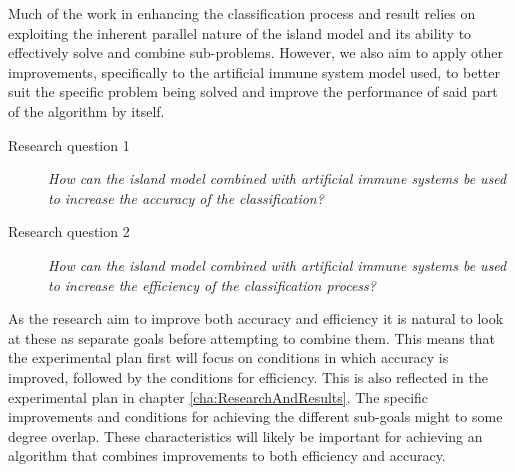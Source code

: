 Much of the work in enhancing the classification process and result relies on exploiting the inherent parallel nature of the island model and its ability to effectively solve and combine sub-problems. However, we also aim to apply other improvements, specifically to the artificial immune system model used, to better suit the specific problem being solved and improve the performance of said part of the algorithm by itself.

\begin{description}
\item[Research question 1] {\it How can the island model combined with artificial immune systems be used to increase the accuracy of the classification?}
\end{description}

\begin{description}
\item[Research question 2] {\it How can the island model combined with artificial immune systems be used to increase the efficiency of the classification process?}
\end{description}

\noindent
As the research aim to improve both accuracy and efficiency it is natural to look at these as separate goals before attempting to combine them.
This means that the experimental plan first will focus on conditions in which accuracy is improved, followed by the conditions for efficiency. This is also reflected in the experimental plan in chapter \ref{cha:ResearchAndResults}. The specific improvements and conditions for achieving the different sub-goals might to some degree overlap. These characteristics will likely be important for achieving an algorithm that combines improvements to both efficiency and accuracy.

